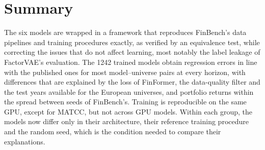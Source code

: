 

\section{Summary}
\label{sec:fw_summary}

The six models are wrapped in a framework that reproduces FinBench's data pipelines and training procedures exactly, as verified by an equivalence test, while correcting the issues that do not affect learning, most notably the label leakage of FactorVAE's evaluation. The 1242 trained models obtain regression errors in line with the published ones for most model--universe pairs at every horizon, with differences that are explained by the loss of FinFormer, the data-quality filter and the test years available for the European universes, and portfolio returns within the spread between seeds of FinBench's. Training is reproducible on the same GPU, except for MATCC, but not across GPU models. Within each group, the models now differ only in their architecture, their reference training procedure and the random seed, which is the condition needed to compare their explanations.
